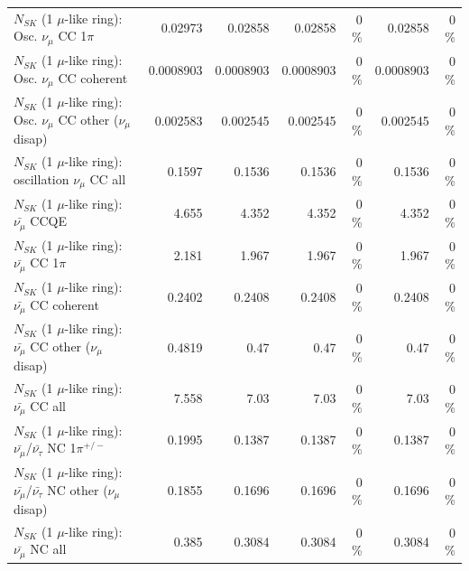 \begin{table}
\begin{tabular}{| l | r | r | r  r | r  r |}
                          $N_{SK}$ (1 $\mu$-like ring): Osc. $\nu_\mu$ CC 1$\pi$ &         0.02973 &         0.02858 &         0.02858 &        0 \%  &         0.02858 &        0 \%  \\ 
                        $N_{SK}$ (1 $\mu$-like ring): Osc. $\nu_\mu$ CC coherent &       0.0008903 &       0.0008903 &       0.0008903 &        0 \%  &       0.0008903 &        0 \%  \\ 
         $N_{SK}$ (1 $\mu$-like ring): Osc. $\nu_\mu$ CC other ($\nu_\mu$ disap) &        0.002583 &        0.002545 &        0.002545 &        0 \%  &        0.002545 &        0 \%  \\ 
                      $N_{SK}$ (1 $\mu$-like ring): oscillation $\nu_\mu$ CC all &          0.1597 &          0.1536 &          0.1536 &        0 \%  &          0.1536 &        0 \%  \\ 
\hline
\hline
                              $N_{SK}$ (1 $\mu$-like ring): $\bar{\nu_\mu}$ CCQE &           4.655 &           4.352 &           4.352 &        0 \%  &           4.352 &        0 \%  \\ 
                         $N_{SK}$ (1 $\mu$-like ring): $\bar{\nu_\mu}$ CC 1$\pi$ &           2.181 &           1.967 &           1.967 &        0 \%  &           1.967 &        0 \%  \\ 
                       $N_{SK}$ (1 $\mu$-like ring): $\bar{\nu_\mu}$ CC coherent &          0.2402 &          0.2408 &          0.2408 &        0 \%  &          0.2408 &        0 \%  \\ 
        $N_{SK}$ (1 $\mu$-like ring): $\bar{\nu_\mu}$ CC other ($\nu_\mu$ disap) &          0.4819 &            0.47 &            0.47 &        0 \%  &            0.47 &        0 \%  \\ 
                          $N_{SK}$ (1 $\mu$-like ring): $\bar{\nu_{\mu}}$ CC all &           7.558 &            7.03 &            7.03 &        0 \%  &            7.03 &        0 \%  \\ 
\hline
  $N_{SK}$ (1 $\mu$-like ring): $\bar{\nu_\mu}$/$\bar{\nu_\tau}$ NC 1$\pi^{+/-}$ &          0.1995 &          0.1387 &          0.1387 &        0 \%  &          0.1387 &        0 \%  \\ 
$N_{SK}$ (1 $\mu$-like ring): $\bar{\nu_\mu}$/$\bar{\nu_\tau}$ NC other ($\nu_\mu$ disap) &          0.1855 &          0.1696 &          0.1696 &        0 \%  &          0.1696 &        0 \%  \\ 
                          $N_{SK}$ (1 $\mu$-like ring): $\bar{\nu_{\mu}}$ NC all &           0.385 &          0.3084 &          0.3084 &        0 \%  &          0.3084 &        0 \%  \\ 

\end{tabular}
\end{table}

